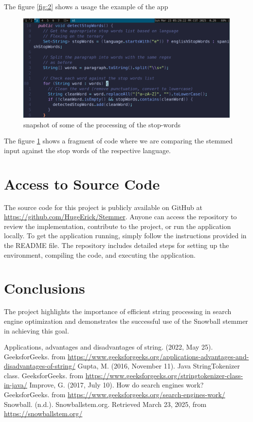 \documentclass[twoside]{article}
\begin{document}
The figure \ref{fig:2} shows a usage the example of the app

\begin{figure}[H]
  \centering
  \includegraphics[width=1\textwidth]{imgs/stopWords.png}
  \caption{snapshot of some of the processing of the stop-words}
  \label{fig:3}
\end{figure}

The figure \ref{fig:3} shows a fragment of code where we are comparing the stemmed input against the stop words of the respective language\cite{geeksforgeeks2}.


\section{Access to Source Code}
The source code for this project is publicly available on GitHub at \url{https://github.com/HugeErick/Stemmer}. Anyone can access the repository to review the implementation, contribute to the project, or run the application locally. To get the application running, simply follow the instructions provided in the README file. The repository includes detailed steps for setting up the environment, compiling the code, and executing the application.

\section{Conclusions}
The project highlights the importance of efficient string processing in search engine optimization and demonstrates the successful use of the Snowball stemmer in achieving this goal.

\begin{thebibliography}{9}
  Applications, advantages and disadvantages of string. (2022, May 25). GeeksforGeeks. from \url{https://www.geeksforgeeks.org/applications-advantages-and-disadvantages-of-string/} 
  Gupta, M. (2016, November 11). Java StringTokenizer class. GeeksforGeeks. from \url{https://www.geeksforgeeks.org/stringtokenizer-class-in-java/} 
  Improve, G. (2017, July 10). How do search engines work? GeeksforGeeks. from \url{https://www.geeksforgeeks.org/search-engines-work/} 
  Snowball. (n.d.). Snowballstem.org. Retrieved March 23, 2025, from \url{https://snowballstem.org/}
\end{thebibliography}
\end{document}
